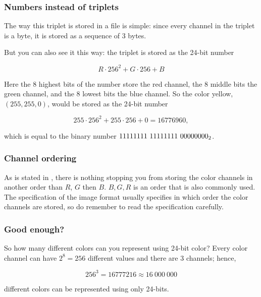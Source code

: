 \subsubsection{Numbers instead of triplets}

The way this triplet is stored in a file is simple: since every
channel in the triplet is a byte, it is stored as a sequence of 3
bytes.

But you can also see it this way: the triplet is stored as the 24-bit
number

\begin{equation*}
 R \cdot 256^2 + G \cdot 256 + B
\end{equation*}

Here the 8 highest bits of the number store the red channel, the 8
middle bits the green channel, and the 8 lowest bits the blue
channel. So the color yellow,$(255,255,0)$, would be stored as the
24-bit number

\begin{equation*}
  255 \cdot 256^2 + 255 \cdot 256 + 0 = 16776960,
\end{equation*}

which is equal to the binary number $\mbox{\ensuremath{11111111\ 11111111\ 00000000_2}}$.

\subsubsection{Channel ordering}

As is stated in \cite{murray1996encyclopedia}, there is nothing
stopping you from storing the color channels in another order than
$R$, $G$ then $B$. $B,G,R$ is an order that is also commonly used. The
specification of the image format usually specifies in which order the
color channels are stored, so do remember to read the specification
carefully.

\subsubsection{Good enough?}

So how many different colors can you represent using 24-bit color?
Every color channel can have $2^8 = 256$ different values and there
are $3$ channels; hence,

\begin{equation*}
 256^3 = 16777216 \approx 16\ 000\ 000
\end{equation*}

different colors can be represented using only 24-bits.

